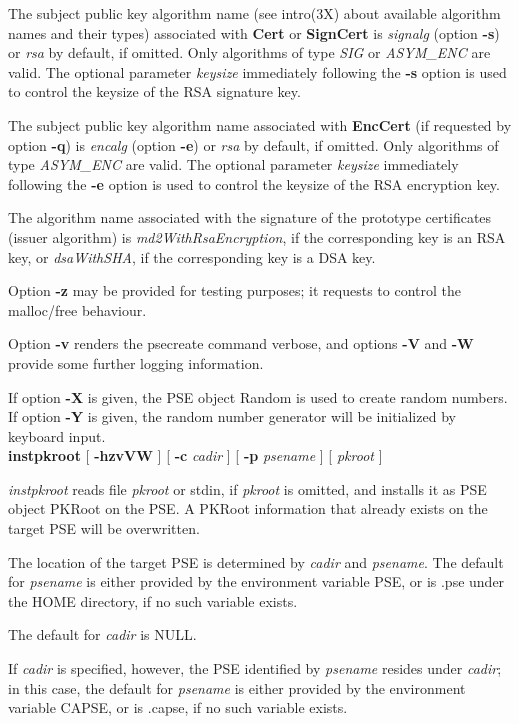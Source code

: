 The subject public key algorithm name (see intro(3X) about available 
algorithm names and their types) associated with {\bf Cert} or {\bf SignCert} is {\em signalg} 
(option {\bf -s}) or {\em rsa} by default, if omitted. Only algorithms of type {\em SIG} or {\em ASYM\_ENC} are valid. 
The optional parameter {\em keysize} immediately following the {\bf -s} option is used to control
the keysize of the RSA signature key.

The subject public key algorithm name associated with {\bf EncCert} (if requested by option {\bf -q})
is {\em encalg} (option {\bf -e}) or {\em rsa} by default, 
if omitted. Only algorithms of type {\em ASYM\_ENC} are valid. The optional
parameter {\em keysize} immediately following the {\bf -e} option is used to control
the keysize of the RSA encryption key.

The algorithm name associated with the signature of the prototype certificates 
(issuer algorithm) is {\em md2WithRsaEncryption}, if the corresponding key is an RSA key,
or {\em dsaWithSHA}, if the corresponding key is a DSA key. 

Option {\bf -z} may be provided for testing purposes; it requests to control the malloc/free behaviour.

Option {\bf -v} renders the psecreate command verbose, and options {\bf -V} and {\bf -W} 
provide some further logging
information.

If option {\bf -X} is given, the PSE object Random
is used to create random numbers.
If option {\bf -Y} is given, the random number generator
will be initialized by keyboard input.
\\ [1em]
{\bf instpkroot} [ {\bf -hzvVW} ] [ {\bf -c} {\em cadir} ] [ {\bf -p} {\em psename} ] [ {\em pkroot} ]

{\em instpkroot} reads file {\em pkroot} or stdin, if {\em pkroot} is omitted, and installs it as
PSE object PKRoot on the PSE. A PKRoot information that already exists on the target PSE will
be overwritten.
 
The location of the target PSE is determined by {\em cadir} and {\em psename}. The default for {\em 
psename} is either provided by the environment variable PSE, or is .pse under the HOME directory, 
if no such variable exists.
 
The default for {\em cadir} is NULL. 

If {\em cadir} is specified,
however, the PSE identified by {\em psename} resides under {\em cadir}; in this case, the default
for {\em psename} is either provided by the environment variable CAPSE, or is .capse, if no such variable
exists.
 
